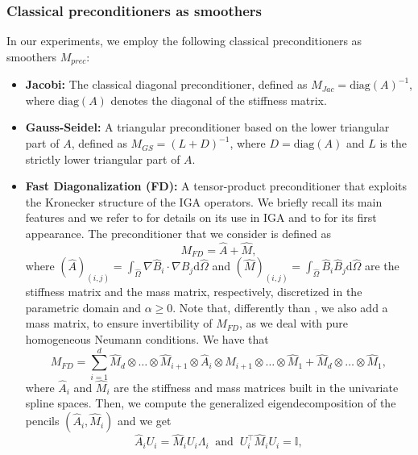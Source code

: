 \documentclass{article}
\theoremstyle{plain}
\numberwithin{equation}{section}
\begin{document}
\subsubsection{Classical preconditioners as smoothers}\label{sec:classical_smoothers}
In our experiments, we employ the following classical preconditioners as smoothers $M_{prec}$:
\begin{itemize}
    \item \textbf{Jacobi:} The classical diagonal preconditioner, defined as $M_{Jac} = \text{diag}(A)^{-1}$, where $\text{diag}(A)$ denotes the diagonal of the stiffness matrix.
    \item \textbf{Gauss-Seidel:} A triangular preconditioner based on the lower triangular part of $A$, defined as $M_{GS} = (L + D)^{-1}$, where $D = \text{diag}(A)$ and $L$ is the strictly lower triangular part of $A$.
    \item \textbf{Fast Diagonalization (FD):} A tensor-product preconditioner that exploits the Kronecker structure of the IGA operators. We briefly recall its main features and we refer to \cite{sangalli2016isogeometric} for details on its use in IGA and to \cite{Lynch1964} for its first appearance. The preconditioner that we consider is defined as
          $$
              M_{FD}=\widehat{A}+\widehat{M},
          $$
          where $(\widehat{A})_{(i,j)}=\int_{\widehat{\Omega}}\nabla\widehat{B}_i\cdot\nabla\widehat{B}_j \mathrm{d}\widehat{\Omega}$ and $(\widehat{M})_{(i,j)}=\int_{\widehat{\Omega}}\widehat{B}_i\widehat{B}_j \mathrm{d}\widehat{\Omega}$  are the stiffness matrix and the mass matrix, respectively, discretized in the parametric domain and $\alpha\geq 0$. Note that, differently than \cite{sangalli2016isogeometric}, we also add a mass matrix, to ensure invertibility of $ M_{FD}$, as we deal with pure homogeneous Neumann conditions.
          We have that
          \begin{equation}
              \label{eq:FD}
              M_{FD}=\sum_{i=1}^d \widehat{M}_d\otimes\dots\otimes\widehat{M}_{i+1}\otimes\widehat{A}_i\otimes\widehat{M}_{i+1}\otimes \dots\otimes \widehat{M}_1 + \widehat{M}_d\otimes \dots \otimes \widehat{M}_1 ,
          \end{equation}
          where $\widehat{A}_i$ and $\widehat{M}_i$ are the stiffness and mass matrices built in the univariate spline spaces. Then, we compute the generalized eigendecomposition of the pencils $(\widehat{A}_i, \widehat{M}_i)$ and we get
          $$
              \widehat{A}_iU_i=\widehat{M}_iU_i\Lambda_i \ \text{ and }\ U_i^{\top}\widehat{M}_iU_i=\mathbb{I},
$$
\end{itemize}
\end{document}
